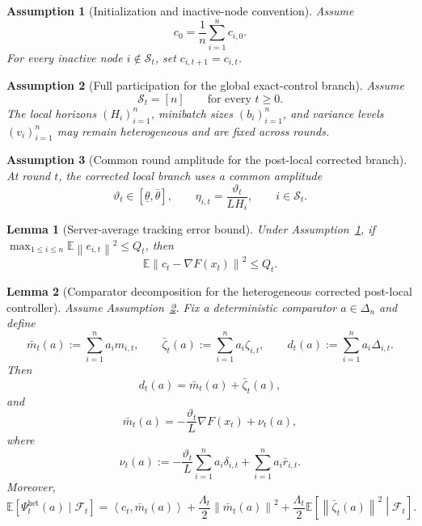 \documentclass[10pt,a4paper]{amsart}
\newtheorem{lemma}{Lemma}
\newtheorem{assumption}{Assumption}
\newcommand{\EE}{\mathbb E}
\newcommand{\ip}[2]{\left\langle #1,#2\right\rangle}
\newcommand{\norm}[1]{\left\lVert #1\right\rVert}
\begin{document}
\begin{assumption}[Initialization and inactive-node convention]
\label{ass:init}
Assume
\begin{equation}
c_0=\frac1n\sum_{i=1}^n c_{i,0}.
\label{eq:init}
\end{equation}
For every inactive node $i\notin \mathcal S_t$, set $c_{i,t+1}=c_{i,t}$.
\end{assumption}

\begin{assumption}[Full participation for the global exact-control branch]
\label{ass:full-global}
Assume
\[
\mathcal S_t=[n]
\qquad
\text{for every }t\ge 0.
\]
The local horizons $(H_i)_{i=1}^n$, minibatch sizes $(b_i)_{i=1}^n$, and
variance levels $(v_i)_{i=1}^n$ may remain heterogeneous and are fixed across
rounds.
\end{assumption}

\begin{assumption}[Common round amplitude for the post-local corrected branch]
\label{ass:realized-common-theta}
At round $t$, the corrected local branch uses a common amplitude
\[
\vartheta_t\in[\underline\theta,\bar\theta],
\qquad
\eta_{i,t}=\frac{\vartheta_t}{L H_i},
\qquad
i\in \mathcal S_t.
\]
\end{assumption}

\begin{lemma}[Server-average tracking error bound]
\label{lem:realized-het-server-error}
Under Assumption~\ref{ass:init}, if $\max_{1\le i\le n}\EE\norm{e_{i,t}}^2\le Q_t$,
then
\begin{equation}
\EE\norm{c_t-\nabla F(x_t)}^2\le Q_t.
\label{eq:realized-het-server-error}\end{equation}
\end{lemma}

\begin{lemma}[Comparator decomposition for the heterogeneous corrected post-local controller]
\label{lem:realized-het-decomp}
Assume Assumption~\ref{ass:full-global}. Fix a deterministic comparator $a\in\Delta_n$ and define
\[
\bar m_t(a):=\sum_{i=1}^n a_i m_{i,t},
\qquad
\bar\zeta_t(a):=\sum_{i=1}^n a_i \zeta_{i,t},
\qquad
d_t(a):=\sum_{i=1}^n a_i \Delta_{i,t}.
\]
Then
\begin{equation}
d_t(a)=\bar m_t(a)+\bar\zeta_t(a),
\label{eq:realized-het-decomp-1}\end{equation}
and
\begin{equation}
\bar m_t(a)
=
-\frac{\vartheta_t}{L}\nabla F(x_t)+\nu_t(a),
\label{eq:realized-het-decomp-2}\end{equation}
where
\begin{equation}
\nu_t(a)
:=
-\frac{\vartheta_t}{L}\sum_{i=1}^n a_i \delta_{i,t}
+
\sum_{i=1}^n a_i \bar r_{i,t}.
\label{eq:realized-het-nu-def}\end{equation}
Moreover,
\begin{equation}
\EE[\Psi_t^{\mathrm{het}}(a)\mid \mathcal F_t]
=
\ip{c_t}{\bar m_t(a)}
+
\frac{\Lambda_t}{2}\norm{\bar m_t(a)}^2
+
\frac{\Lambda_t}{2}\EE\!\left[\norm{\bar\zeta_t(a)}^2\middle|\mathcal F_t\right].
\label{eq:realized-het-psi-cond}\end{equation}
\end{lemma}
\end{document}
